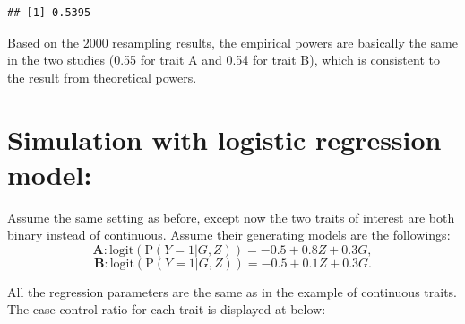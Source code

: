 \documentclass[
]{article}
\begin{document}
\begin{verbatim}
## [1] 0.5395
\end{verbatim}

Based on the \(2000\) resampling results, the empirical powers are
basically the same in the two studies (0.55 for trait A and 0.54 for
trait B), which is consistent to the result from theoretical powers.

\hypertarget{simulation-with-logistic-regression-model}{%
\section{Simulation with logistic regression
model:}\label{simulation-with-logistic-regression-model}}

Assume the same setting as before, except now the two traits of interest
are both binary instead of continuous. Assume their generating models
are the followings:
\[\textbf{A}:\text{logit}(\text{P}(Y=1|G,Z)) = -0.5 + 0.8Z + 0.3G,\]
\[\textbf{B}: \text{logit}(\text{P}(Y=1|G,Z)) = -0.5 + 0.1Z + 0.3G.\]

All the regression parameters are the same as in the example of
continuous traits. The case-control ratio for each trait is displayed at
below:
\end{document}
